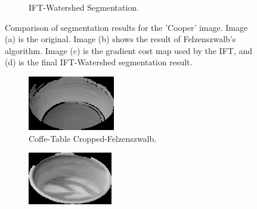 \documentclass{sbc2023}
\begin{document}
\begin{figure}[H]
\begin{subfigure}[b]{0.14\textwidth}
            \caption{IFT-Watershed Segmentation.}
            \label{fig:cooper_ift}
        \end{subfigure}
    \caption{Comparison of segmentation results for the 'Cooper' image. Image (a) is the original. Image (b) shows the result of Felzenszwalb's algorithm. Image (c) is the gradient cost map used by the IFT, and (d) is the final IFT-Watershed segmentation result.}
    \label{fig:segmentation_comparison_cooper}
    \end{figure}

    \begin{figure}[H]
    \centering
        \begin{subfigure}[b]{0.14\textwidth}
            \includegraphics[width=\textwidth]{imgs/coffe-tableGray_felzenszwalb_cropped_segment.png}
            \caption{Coffe-Table Cropped-Felzenszwalb.}
            \label{fig:coffe-table_cropped_felzenszwalb}
        \end{subfigure}
    \hfill
        \begin{subfigure}[b]{0.14\textwidth}
            \includegraphics[width=\textwidth]{imgs/coffe-tableGray_ift_watershed_cropped_segment.png}

\end{subfigure}
\end{figure}
\end{document}
